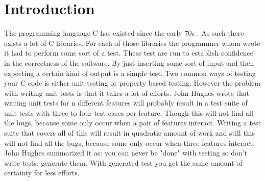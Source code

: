 \section{Introduction}

The programming language C has existed since the early 70s \citep{website:en.wikipedia.org}.
As such there exists a lot of C libraries. 
For each of those libraries the programmer whom wrote it had to perform some sort of a test.
These test are run to establish confidence in the correctness of the software.
By just inserting some sort of input and then expecting a certain kind of output is a simple test.
Two common ways of testing your C code is either unit testing or property based testing.
However the problem with writing unit tests is that it takes a lot of efforts.
John Hughes wrote \citep{QuickCheckQuviq} that writing unit tests for n different features will probably result in a test suite of unit tests with three to four test cases per feature.
Though this will not find all the bugs, because some only occur when a pair of features interact.
Writing a test suite that covers all of this will result in quadratic amount of work and still this will not find all the bugs, because some only occur when three features interact.
John Hughes summarized it as: you can never be "done" with testing so don't write tests, generate them.
With generated test you get the same amount of certainty for less efforts.
